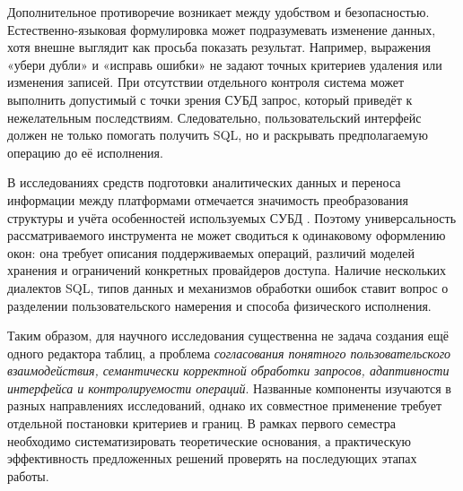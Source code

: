 Дополнительное противоречие возникает между удобством и безопасностью. Естественно-языковая формулировка может подразумевать изменение данных, хотя внешне выглядит как просьба показать результат. Например, выражения «убери дубли» и «исправь ошибки» не задают точных критериев удаления или изменения записей. При отсутствии отдельного контроля система может выполнить допустимый с точки зрения СУБД запрос, который приведёт к нежелательным последствиям. Следовательно, пользовательский интерфейс должен не только помогать получить SQL, но и раскрывать предполагаемую операцию до её исполнения.

В исследованиях средств подготовки аналитических данных и переноса информации между платформами отмечается значимость преобразования структуры и учёта особенностей используемых СУБД \cite{kartamyshev2023,voronchikhin2024}. Поэтому универсальность рассматриваемого инструмента не может сводиться к одинаковому оформлению окон: она требует описания поддерживаемых операций, различий моделей хранения и ограничений конкретных провайдеров доступа. Наличие нескольких диалектов SQL, типов данных и механизмов обработки ошибок ставит вопрос о разделении пользовательского намерения и способа физического исполнения.

Таким образом, для научного исследования существенна не задача создания ещё одного редактора таблиц, а проблема \emph{согласования понятного пользовательского взаимодействия, семантически корректной обработки запросов, адаптивности интерфейса и контролируемости операций}. Названные компоненты изучаются в разных направлениях исследований, однако их совместное применение требует отдельной постановки критериев и границ. В рамках первого семестра необходимо систематизировать теоретические основания, а практическую эффективность предложенных решений проверять на последующих этапах работы.